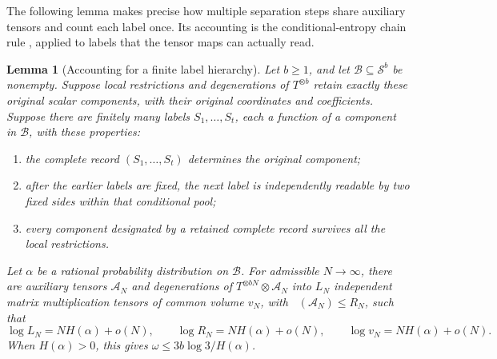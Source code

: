 \documentclass[11pt]{article}
\numberwithin{equation}{section}
\newtheorem{lemma}[theorem]{Lemma}
\theoremstyle{definition}
\theoremstyle{remark}
\DeclareMathOperator{\brank}{\underline R}
\begin{document}
The following lemma makes precise how multiple separation steps share
auxiliary tensors and count each label once.  Its accounting is the
conditional-entropy chain rule \citep{shannon1948}, applied to labels
that the tensor maps can actually read.

\begin{lemma}[Accounting for a finite label hierarchy]
\label{lem:hierarchy}
Let \(b\geq1\), and let \(\mathcal B\subseteq\mathcal S^b\) be
nonempty.  Suppose local restrictions and degenerations of
\(T^{\otimes b}\) retain exactly these original scalar components, with
their original coordinates and coefficients.  Suppose there are finitely many
labels \(S_1,\ldots,S_t\), each a function of a component in
\(\mathcal B\), with these properties:
\begin{enumerate}[label=\textup{(\roman*)}]
 \item the complete record \((S_1,\ldots,S_t)\) determines the original
       component;
 \item after the earlier labels are fixed, the next label is independently
       readable by two fixed sides within that conditional pool;
 \item every component designated by a retained complete record survives
       all the local restrictions.
\end{enumerate}
Let \(\alpha\) be a rational probability distribution on \(\mathcal B\).
For admissible \(N\to\infty\), there are auxiliary tensors
\(\mathcal A_N\) and degenerations of
\(T^{\otimes bN}\otimes\mathcal A_N\) into \(L_N\) independent matrix
multiplication tensors of common volume \(v_N\), with
\(\brank(\mathcal A_N)\leq R_N\), such that
\begin{equation}
 \log L_N=NH(\alpha)+o(N),\qquad
 \log R_N=NH(\alpha)+o(N),\qquad
 \log v_N=NH(\alpha)+o(N).
 \label{alg:hierarchy-rates}
\end{equation}
When \(H(\alpha)>0\), this gives
\(\omega\leq3b\log3/H(\alpha)\).
\end{lemma}
\end{document}
